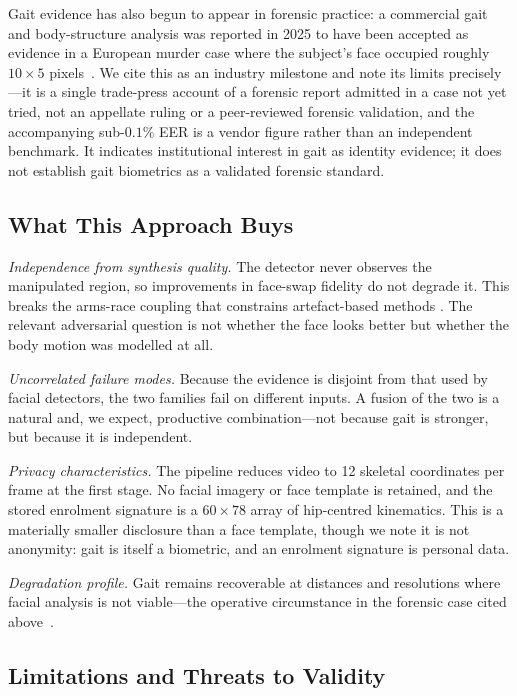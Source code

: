 \documentclass[journal]{IEEEtran}
\begin{document}
Gait evidence has also begun to appear in forensic practice: a commercial gait
and body-structure analysis was reported in 2025 to have been accepted as
evidence in a European murder case where the subject's face occupied roughly
$10 \times 5$ pixels~\cite{forensic_gait}. We cite this as an industry
milestone and note its limits precisely---it is a single trade-press account of
a forensic report admitted in a case not yet tried, not an appellate ruling or
a peer-reviewed forensic validation, and the accompanying sub-$0.1\%$ EER is a
vendor figure rather than an independent benchmark. It indicates institutional
interest in gait as identity evidence; it does not establish gait biometrics as
a validated forensic standard.

\subsection{What This Approach Buys}

\emph{Independence from synthesis quality.} The detector never observes the
manipulated region, so improvements in face-swap fidelity do not degrade it.
This breaks the arms-race coupling that constrains artefact-based methods
\cite{recce,altfreezing}. The relevant adversarial question is not whether the
face looks better but whether the body motion was modelled at all.

\emph{Uncorrelated failure modes.} Because the evidence is disjoint from that
used by facial detectors, the two families fail on different inputs. A fusion
of the two is a natural and, we expect, productive combination---not because
gait is stronger, but because it is independent.

\emph{Privacy characteristics.} The pipeline reduces video to 12 skeletal
coordinates per frame at the first stage. No facial imagery or face template is
retained, and the stored enrolment signature is a $60 \times 78$ array of
hip-centred kinematics. This is a materially smaller disclosure than a face
template, though we note it is not anonymity: gait is itself a biometric, and
an enrolment signature is personal data.

\emph{Degradation profile.} Gait remains recoverable at distances and
resolutions where facial analysis is not viable---the operative circumstance in
the forensic case cited above~\cite{forensic_gait}.

\subsection{Limitations and Threats to Validity}
\label{sec:threats}
\end{document}

